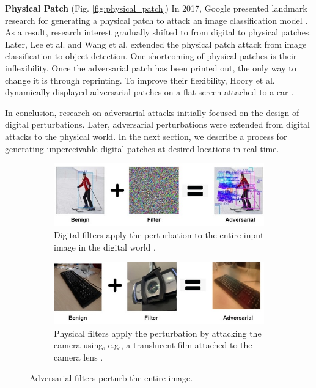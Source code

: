 \textbf{Physical Patch} (Fig. \ref{fig:physical_patch}) In 2017, Google presented landmark research for generating a physical patch to attack an image classification model \citep{brown2017patch}. As a result, research interest gradually shifted to from digital to physical patches. Later, Lee et al. \citep{lee2019physical} and Wang et al. \citep{wang2021daedalus} extended the physical patch attack from image classification to object detection. One shortcoming of physical patches is their inflexibility. Once the adversarial patch has been printed out, the only way to change it is through reprinting. To improve their flexibility, Hoory et al. dynamically displayed adversarial patches on a flat screen attached to a car \citep{hoory2020dynamic}.

In conclusion, research on adversarial attacks initially focused on the design of digital perturbations. Later, adversarial perturbations were extended from digital attacks to the physical world. In the next section, we describe a process for generating unperceivable digital patches at desired locations in real-time.


\begin{figure}[H]
    \centering
    \begin{subfigure}[b]{\textwidth}
        \includegraphics[width=\textwidth]{figures/chapter_detection/detection/digital_filter.jpg}
        \caption{Digital filters apply the perturbation to the entire input image in the digital world \citep{wang2021daedalus}.}
        \label{fig:digital_filter}
    \end{subfigure}
    \begin{subfigure}[b]{\textwidth}
        \includegraphics[width=\textwidth]{figures/chapter_detection/detection/physical_filter.jpg}
        \caption{Physical filters apply the perturbation by attacking the camera using, e.g., a translucent film attached to the camera lens \citep{li2019adversarial}.}
        \label{fig:physical_filter}
    \end{subfigure}
    \caption{Adversarial filters perturb the entire image.}
    \label{fig:filter}
\end{figure}


